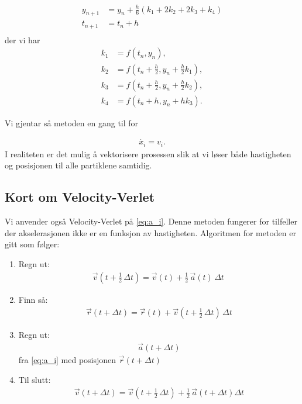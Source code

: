 \documentclass[11pt]{article}
\begin{document}
\begin{multicols}{2}
\begin{align*}
y_{n+1} &= y_n + \tfrac{h}{6}\left(k_1 + 2k_2 + 2k_3 + k_4 \right)\\
t_{n+1} &= t_n + h \\
\end{align*}
der vi har
\begin{align*}
k_1 &= f(t_n, y_n), \\
k_2 &= f(t_n + \tfrac{h}{2}, y_n + \tfrac{h}{2} k_1), \\
k_3 &= f(t_n + \tfrac{h}{2}, y_n + \tfrac{h}{2} k_2), \\
k_4 &= f(t_n + h, y_n + hk_3).
\end{align*}

Vi gjentar så metoden en gang til for 

\begin{align*}
\dot{x_i} = v_i.
\end{align*}
I realiteten er det mulig å vektorisere prosessen slik at vi løser
både hastigheten og posisjonen til alle partiklene samtidig.

\subsection{Kort om Velocity-Verlet~\small{\cite{Velocity-Verlet}}}
\label{sec:om-VV}
Vi anvender også Velocity-Verlet på \eqref{eq:a_i}. Denne metoden fungerer for tilfeller der 
akselerasjonen ikke er en funksjon av hastigheten. 
Algoritmen for metoden er gitt som følger:

\begin{enumerate}
\item Regn ut: \begin{align*}
\vec{v}\left(t + \tfrac12\,\Delta t\right) = \vec{v}(t) + \tfrac12\,\vec{a}(t)\,\Delta t\ 
\end{align*}


\item Finn så: \begin{align*} \vec{r}(t + \Delta t) = \vec{r}(t) + \vec{v}\left(t + \tfrac12\,\Delta t\right)\, \Delta t \end{align*}


\item Regn ut: \begin{align*} \vec{a}(t + \Delta t) 
\end{align*} fra \eqref{eq:a_i} med posisjonen $ \vec{r}(t + \Delta t) $


\item Til slutt: \begin{align*} \vec{v}(t + \Delta t) = \vec{v}\left(t + \tfrac12\,\Delta t\right) + \tfrac12\,\vec{a}(t + \Delta t)\Delta t \end{align*}
\end{enumerate}


\end{multicols}
\end{document}
